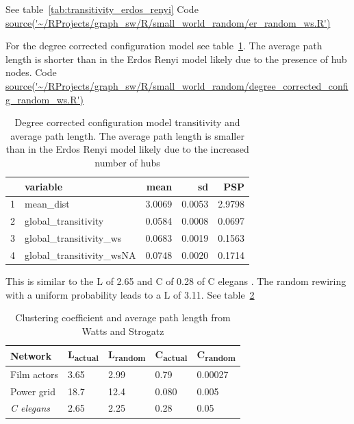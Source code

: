 See table~\ref{tab:transitivity_erdos_renyi}
Code \url{source('~/RProjects/graph_sw/R/small_world_random/er_random_ws.R')}

For the degree corrected configuration model see table~\ref{tab:cmtransitivity_configuration_model}. The average path length is shorter than in the Erdos Renyi model likely due to the presence of hub nodes. Code \url{source('~/RProjects/graph_sw/R/small_world_random/degree_corrected_config_random_ws.R')}

\begin{table}[ht]
\centering
\begin{tabular}{rlrrr}
  \hline
 & variable & mean & sd & PSP \\ 
  \hline
1 & mean\_dist & 3.0069 & 0.0053 & 2.9798 \\ 
  2 & global\_transitivity & 0.0584 & 0.0008 & 0.0697 \\ 
  3 & global\_transitivity\_ws & 0.0683 & 0.0019 & 0.1563 \\ 
  4 & global\_transitivity\_wsNA & 0.0748 & 0.0020 & 0.1714 \\ 
   \hline
\end{tabular}
\caption{Degree corrected configuration model transitivity and average path length. The average path length is smaller than in the Erdos Renyi model likely due to the increased number of hubs}
\label{tab:cmtransitivity_configuration_model}
\end{table}
This is similar to the L of 2.65 and C of 0.28 of C elegans . The random rewiring with a uniform probability leads to a L of 3.11.  See table~\ref{tab:clustering and path length Watts and Strogatz}


\begin{table}[h]
    \centering
    \begin{tabular}{lllll}
    Network      & L\textsubscript{actual} & L\textsubscript{random} & C\textsubscript{actual} & C\textsubscript{random} \\
    \hline
     Film actors    & 3.65 & 2.99 & 0.79 & 0.00027\\
     Power grid & 18.7 & 12.4 & 0.080 & 0.005 \\
     \textit{C elegans} & 2.65 & 2.25 & 0.28 & 0.05 \\
    \end{tabular}
    \caption{Clustering coefficient and average path length from Watts and Strogatz}
    \label{tab:clustering and path length Watts and Strogatz}
\end{table}

